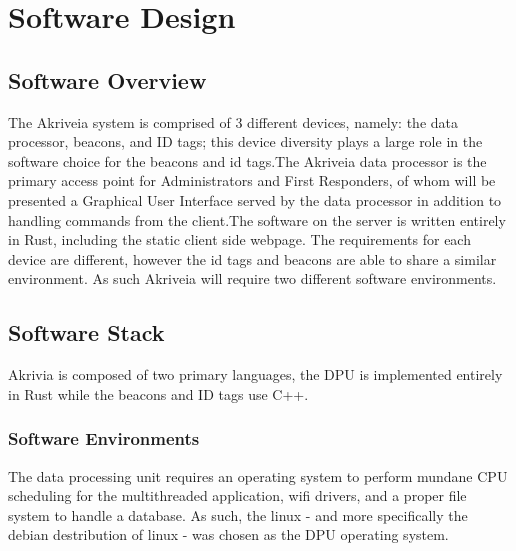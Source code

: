 

\setcounter{section}{5}
\section{Software Design}
\bigskip



\subsection{Software Overview}
The Akriveia system is comprised of 3 different devices, namely: the data processor, beacons, and ID tags; this device diversity plays a large role in the software choice for the beacons and id tags.The Akriveia data processor is the primary access point for Administrators and First Responders, of whom will be presented a Graphical User Interface served by the data processor in addition to handling commands from the client.The software on the server is written entirely in Rust, including the static client side webpage. The requirements for each device are different, however the id tags and beacons are able to share a similar environment.
As such Akriveia will require two different software environments.

\medskip
\subsection{Software Stack}
Akrivia is composed of two primary languages, the DPU is implemented entirely in Rust while the beacons and ID tags use C++.

\medskip
\subsubsection{Software Environments}
The data processing unit requires an operating system to perform mundane CPU scheduling for the multithreaded application, wifi drivers, and a proper file system to handle a database.
As such, the linux - and more specifically the debian destribution of linux - was chosen as the DPU operating system.

